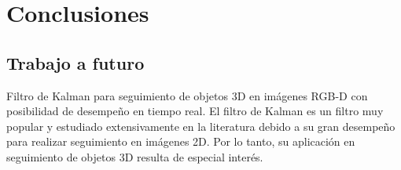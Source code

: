 \chapter{Conclusiones}


\section{Trabajo a futuro}
Filtro de Kalman \cite{welch1995introduction} para seguimiento de objetos 3D en imágenes RGB-D con posibilidad de desempeño en tiempo real. El filtro de Kalman es un filtro muy popular y estudiado extensivamente en la literatura \cite{julier1997new,wan2000unscented} debido a su gran desempeño para realizar seguimiento en imágenes 2D. Por lo tanto, su aplicación en seguimiento de objetos 3D resulta de especial interés.